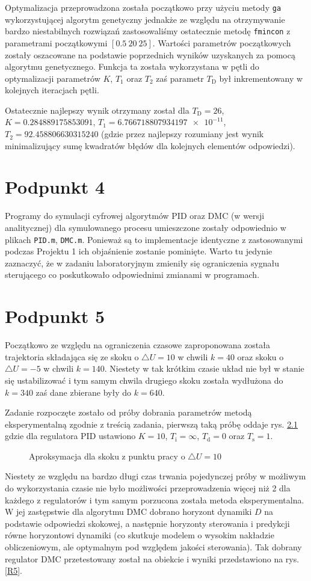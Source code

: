 Optymalizacja przeprowadzona została początkowo przy użyciu metody \verb+ga+ wykorzystującej algorytm genetyczny jednakże ze względu na otrzymywanie bardzo niestabilnych rozwiązań zastosowaliśmy ostatecznie metodę \verb+fmincon+ z parametrami początkowymi $[\num{0,5} ~ 20 ~ 25]$. Wartości parametrów początkowych zostały oszacowane na podstawie poprzednich wyników uzyskanych za pomocą algorytmu genetycznego. Funkcja ta została wykorzystana w pętli do optymalizacji parametrów $K$, $T_1$ oraz $T_2$ zaś parametr $T_{\mathrm{D}}$ był inkrementowany w kolejnych iteracjach pętli.

Ostatecznie najlepszy wynik otrzymany został dla $T_{\mathrm{D}}=26$, $K=\num{0.284889175853091}$, $T_1=\num{6.766718807934197e-11}$, $T_2=\num{92.458806630315240}$ (gdzie przez najlepszy rozumiany jest wynik minimalizujący sumę kwadratów błędów dla kolejnych elementów odpowiedzi).

\chapter{Podpunkt 4}
Programy do symulacji cyfrowej algorytmów PID oraz DMC (w wersji analitycznej) dla symulowanego procesu umieszczone zostały odpowiednio w plikach \verb+PID.m+, \verb+DMC.m+. Ponieważ są to implementacje identyczne z zastosowanymi podczas Projektu 1 ich objaśnienie zostanie pominięte. Warto tu jedynie zaznaczyć, że w zadaniu laboratoryjnym zmieniły się ograniczenia sygnału sterującego co poskutkowało odpowiednimi zmianami w programach.

\chapter{Podpunkt 5}
Początkowo ze względu na ograniczenia czasowe zaproponowana została trajektoria składająca się ze skoku o $\triangle U=10$ w chwili $k=40$ oraz skoku o $\triangle U=-5$ w chwili $k=140$. Niestety w tak krótkim czasie układ nie był w stanie się ustabilizować i tym samym chwila drugiego skoku została wydłużona do $k=340$ zaś dane zbierane były do $k=640$.

Zadanie rozpoczęte zostało od próby dobrania parametrów metodą eksperymentalną zgodnie z treścią zadania, pierwszą taką próbę oddaje rys. \ref{R4} gdzie dla regulatora PID ustawiono $K=10$, $T_{\mathrm{i}}=\infty$, $T_{\mathrm{d}}=0$ oraz $T_{\mathrm{s}}=1$.

\begin{figure}[ht]
\centering

\caption{Aproksymacja dla skoku z punktu pracy o $\triangle U = 10$}
\label{R4}
\end{figure}
Niestety ze względu na bardzo długi czas trwania pojedynczej próby w możliwym do wykorzystania czasie nie było możliwości przeprowadzenia więcej niż 2 dla każdego z regulatorów i tym samym porzucona została metoda eksperymentalna. W jej zastępstwie dla algorytmu DMC dobrano horyzont dynamiki $D$ na podstawie odpowiedzi skokowej, a następnie horyzonty sterowania i predykcji równe horyzontowi dynamiki (co skutkuje modelem o wysokim nakładzie obliczeniowym, ale optymalnym pod względem jakości sterowania). Tak dobrany regulator DMC przetestowany został na obiekcie i wyniki przedstawiono na rys. \ref{R5}.


